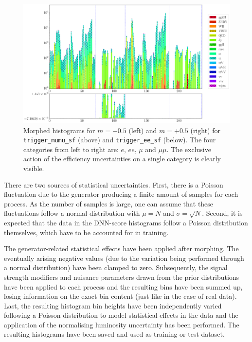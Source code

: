 \begin{figure}[h!]
\begin{minipage}{.5\textwidth}
		\includegraphics[width=\linewidth]{figures/network_setup/trigger_ee_sf_+0.5}
	\end{minipage}
	\caption{Morphed histograms for $m = -0.5$ (left) and $m = +0.5$ (right) for \texttt{trigger\_mumu\_sf} (above) and \texttt{trigger\_ee\_sf} (below). The four categories from left to right are: $e$, $ee$, $\mu$ and $\mu\mu$. The exclusive action of the efficiency uncertainties on a single category is clearly visible.}
	\label{fig:trigger_sf}
\end{figure}


There are two sources of statistical uncertainties. First, there is a Poisson fluctuation due to the generator producing a finite amount of samples for each process. As the number of samples is large, one can assume that these fluctuations follow a normal distribution with $\mu = N$ and $\sigma = \sqrt{N}$. Second, it is expected that the data in the DNN-score histograms follow a Poisson distribution themselves, which have to be accounted for in training.

The generator-related statistical effects have been applied after morphing. The eventually arising negative values (due to the variation being performed through a normal distribution) have been clamped to zero. Subsequently, the signal strength modifiers and nuisance parameters drawn from the prior distributions have been applied to each process and the resulting bins have been summed up, losing information on the exact bin content (just like in the case of real data). Last, the resulting histogram bin heights have been independently varied following a Poisson distribution to model statistical effects in the data and the application of the normalising luminosity uncertainty has been performed. The resulting histograms have been saved and used as training or test dataset.


